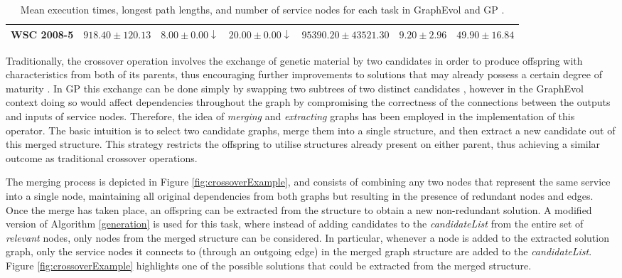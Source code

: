\documentclass{article}
\begin{document}
\begin{table}[t]
{\begin{tabular}{c|c|c|c|c|c|c|}
\multicolumn{1}{|c|}{WSC 2008-5}    & $918.40 \pm 120.13$     & $8.00 \pm 0.00\downarrow$       & $20.00 \pm 0.00\downarrow$                                   & $95390.20 \pm 43521.30$                      & $9.20 \pm 2.96$       & $49.90 \pm 16.84$             \\ \hline
\end{tabular}}
\caption{Mean execution times, longest path lengths, and number of service nodes for each task in GraphEvol and GP \protect\cite{rodriguez2010composition}.}
\label{resultsTable}
\vspace{-0.2cm}
\end{table}

Traditionally, the crossover operation involves the exchange of genetic material by two candidates in order to produce
offspring with characteristics from both of its parents, thus encouraging further improvements to solutions that may already
possess a certain degree of maturity \cite{qi1994theoretical}. In GP this exchange can be done simply by swapping two subtrees
of two distinct candidates \cite{aversano2006genetic}, however in the GraphEvol context doing so would affect dependencies
throughout the graph by compromising the correctness of the connections between the outputs and inputs of service nodes. Therefore,
the idea of \textit{merging} and \textit{extracting} graphs has been employed in the implementation of this operator.
The basic intuition is to select two candidate graphs, merge them into a single structure, and then extract a new candidate out
of this merged structure. This strategy restricts the offspring to utilise structures already present on either parent, thus achieving
a similar outcome as traditional crossover operations.

The merging process is depicted in Figure \ref{fig:crossoverExample},
and consists of combining any two nodes that represent the same service into a single node, maintaining all original dependencies from both
graphs but resulting in the presence of redundant nodes and edges. Once the merge has
taken place, an offspring can be extracted from the structure to obtain a new non-redundant solution. A modified version of Algorithm
\ref{generation} is used for this task, where instead of adding candidates to the \textit{candidateList} from the entire set of
\textit{relevant} nodes, only nodes from the merged structure can be considered. In particular, whenever a node is added to the extracted
solution graph, only the service nodes it connects to (through an outgoing edge) in the merged graph structure are added to the
\textit{candidateList}. Figure \ref{fig:crossoverExample} highlights one of the possible solutions that
could be extracted from the merged structure.
\end{document}
